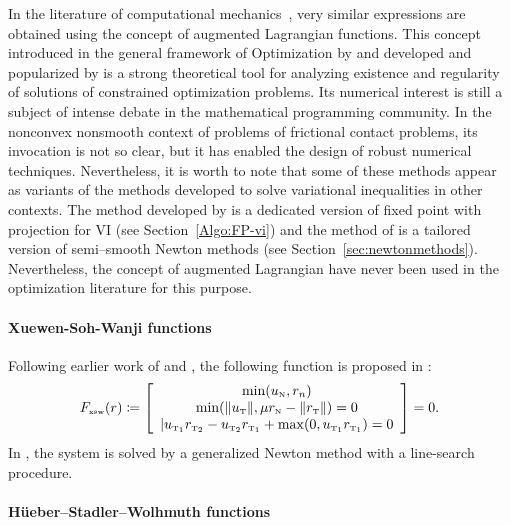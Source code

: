 {\begin{remark}
  \label{Rem:AugmentedLagrangian}
  In the literature of computational mechanics~\cite{Curnier.Alart88,Simo.Laursen1992,Alart.Curnier1991}, very similar expressions are obtained using the concept of augmented Lagrangian functions. This concept introduced in the general framework of Optimization by \cite{Hestenes1969} and developed and popularized by \cite{Rockafellar1974,Rockafellar1993} is a strong theoretical  tool for analyzing existence and regularity of solutions of constrained optimization problems. Its numerical interest is still a subject of intense debate in the mathematical programming community. In the nonconvex  nonsmooth context of problems of frictional contact problems, its invocation is not so clear, but it has enabled the design of robust numerical techniques. Nevertheless, it is worth to note that some of these methods appear as variants of the methods developed to solve variational inequalities in other contexts. The method developed by \cite{Simo.Laursen1992} is a dedicated version of fixed point with projection for VI (see Section~\ref{Algo:FP-vi}) and the method of \cite{Alart.Curnier1991} is a tailored version of semi--smooth Newton methods (see Section~\ref{sec:newtonmethods}). Nevertheless, the concept of augmented Lagrangian have never been used in the optimization literature for this purpose.
\end{remark}

\paragraph{Xuewen-Soh-Wanji functions}
Following earlier work of \cite{Park.Kwak1994} and \cite{Leung.ea1998}, the following function is proposed in \citep{Xuewen.ea2000}:
\begin{equation}
  \label{eq:XSW-II}
  F_{\xswtwo}(r) \coloneqq \left[
    \begin{array}{c}
      \min(u_\n,r_n)\\
      \min(\|u_\t\|, \mu r_\n - \|r_\t\|)=0\\
      | u_{\t_1} r_{\t_2} -  u_{\t_2} r_{\t_1} + \max(0,u_{\t_1} r_{\t_1} ) =0
  \end{array}\right] =0.
\end{equation}
In \citep{Xuewen.ea2000}, the system is solved by a generalized Newton method with a line-search procedure.

\paragraph{H\"{u}eber--Stadler--Wolhmuth functions}

}
